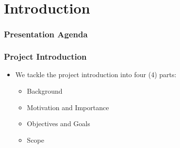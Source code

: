 \section{Introduction}
\begin{frame}
\frametitle{Presentation Agenda}
\tableofcontents[currentsection]
\end{frame}

\begin{frame}
\frametitle{Project Introduction}
	\begin{itemize}
		\item We tackle the project introduction into four (4) parts:
			\begin{itemize}
				\item Background
				\item Motivation and Importance
				\item Objectives and Goals
				\item Scope
			\end{itemize}
	\end{itemize}
\end{frame}






